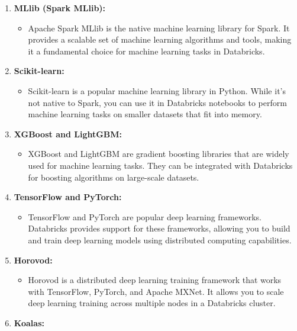 \documentclass[
]{book}
\providecommand{\tightlist}{%
  \setlength{\itemsep}{0pt}\setlength{\parskip}{0pt}}
\begin{document}
\begin{enumerate}
\def\labelenumi{\arabic{enumi}.}
\tightlist
\item
  \textbf{MLlib (Spark MLlib):}

  \begin{itemize}
  \tightlist
  \item
    Apache Spark MLlib is the native machine learning library for Spark. It provides a scalable set of machine learning algorithms and tools, making it a fundamental choice for machine learning tasks in Databricks.
  \end{itemize}
\item
  \textbf{Scikit-learn:}

  \begin{itemize}
  \tightlist
  \item
    Scikit-learn is a popular machine learning library in Python. While it's not native to Spark, you can use it in Databricks notebooks to perform machine learning tasks on smaller datasets that fit into memory.
  \end{itemize}
\item
  \textbf{XGBoost and LightGBM:}

  \begin{itemize}
  \tightlist
  \item
    XGBoost and LightGBM are gradient boosting libraries that are widely used for machine learning tasks. They can be integrated with Databricks for boosting algorithms on large-scale datasets.
  \end{itemize}
\item
  \textbf{TensorFlow and PyTorch:}

  \begin{itemize}
  \tightlist
  \item
    TensorFlow and PyTorch are popular deep learning frameworks. Databricks provides support for these frameworks, allowing you to build and train deep learning models using distributed computing capabilities.
  \end{itemize}
\item
  \textbf{Horovod:}

  \begin{itemize}
  \tightlist
  \item
    Horovod is a distributed deep learning training framework that works with TensorFlow, PyTorch, and Apache MXNet. It allows you to scale deep learning training across multiple nodes in a Databricks cluster.
  \end{itemize}
\item
  \textbf{Koalas:}


\end{enumerate}
\end{document}
